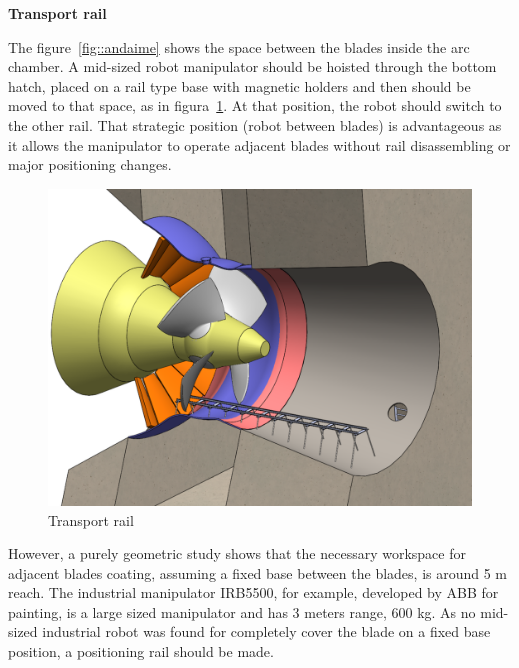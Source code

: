 \textbf{Transport rail}

The figure~\ref{fig::andaime} shows the space between the blades inside the
arc chamber. A mid-sized robot manipulator should be hoisted through the bottom
hatch, placed on a rail type base with magnetic holders and then should be moved
to that space, as in figura~\ref{fig::rail1}. At that position, the robot should
switch to the other rail. That strategic position (robot between blades) is
advantageous as it allows the manipulator to operate adjacent blades without
rail disassembling or major positioning changes.

\begin{figure}[h!]	
	\includegraphics[width=\columnwidth]{figs/manipuladores/rail1.PNG}
	\caption{Transport rail}
	\label{fig::rail1}
\end{figure}


However, a purely geometric study shows that the necessary workspace for
adjacent blades coating, assuming a fixed base between the blades,
is around 5 m reach. The industrial manipulator IRB5500, for example, developed
by ABB for painting, is a large sized manipulator and has 3 meters range, 600 kg.
As no mid-sized industrial robot was found for completely cover
the blade on a fixed base position, a positioning rail should be made.

